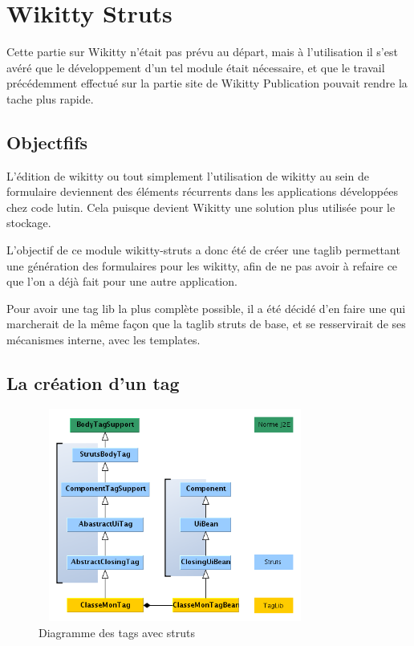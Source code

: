 \section{Wikitty Struts}

Cette partie sur Wikitty n'était pas prévu au départ, mais à l'utilisation
il s'est avéré que le développement d'un tel module était nécessaire, et que
le travail précédemment effectué sur la partie site de Wikitty Publication
pouvait rendre la tache plus rapide.


\subsection{Objectfifs}

L'édition de wikitty ou tout simplement l'utilisation de wikitty au sein de 
formulaire deviennent des éléments récurrents dans les applications développées 
chez code lutin. Cela puisque devient Wikitty une solution plus utilisée pour 
le stockage.

L'objectif de ce module wikitty-struts a donc été de créer une taglib permettant
une génération des formulaires pour les wikitty, afin de ne pas avoir à refaire
ce que l'on a déjà fait pour une autre application.

Pour avoir une tag lib la plus complète possible, il a été décidé d'en faire une
qui marcherait de la même façon que la taglib struts de base, et se resservirait
de ses mécanismes interne, avec les templates.

\subsection{La création d'un tag}

\begin{figure}[!ht]
\centering
\includegraphics[height=7cm,width=9cm]{image/explicationTag.png}
  		\caption{Diagramme des tags avec struts}
  		\label{diagtagstruts}
\end{figure}

